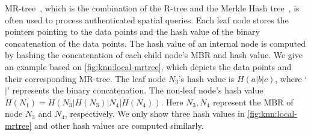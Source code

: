 MR-tree~\cite{10.1007/s00778-008-0113-2}, which is the combination of the R-tree and the Merkle Hash tree~\cite{10.1007/0-387-34805-0_21}, is often used to process authenticated spatial queries. Each leaf node stores the pointers pointing to the data points and the hash value of the binary concatenation of the data points. The hash value of an internal node is computed by hashing the concatenation of each child node's MBR and hash value. We give an example based on \cref{fig:knn:local-mrtree}, which depicts the data points and their corresponding MR-tree. The leaf node $N_{3}$'s hash value is $H(a|b|c)$, where `$|$' represents the binary concatenation. The non-leaf node's hash value $H(N_{1})=H(N_{3}|H(N_{3})|N_{4}|H(N_{4}))$. Here $N_{3}, N_{4}$ represent the MBR of node $N_{3}$ and $N_{4}$, respectively. We only show three hash values in \cref{fig:knn:local-mrtree} and other hash values are computed similarly.

